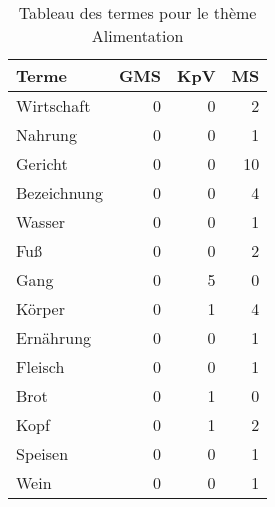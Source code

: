 
\begin{table}[ht]
\centering
\caption{Tableau des termes pour le thème Alimentation}
\label{tab:Alimentation}
\begin{tabular}{lrrr}
\hline
 Terme       &   GMS &   KpV &   MS \\
\hline
 Wirtschaft  &     0 &     0 &    2 \\
 Nahrung     &     0 &     0 &    1 \\
 Gericht     &     0 &     0 &   10 \\
 Bezeichnung &     0 &     0 &    4 \\
 Wasser      &     0 &     0 &    1 \\
 Fuß         &     0 &     0 &    2 \\
 Gang        &     0 &     5 &    0 \\
 Körper      &     0 &     1 &    4 \\
 Ernährung   &     0 &     0 &    1 \\
 Fleisch     &     0 &     0 &    1 \\
 Brot        &     0 &     1 &    0 \\
 Kopf        &     0 &     1 &    2 \\
 Speisen     &     0 &     0 &    1 \\
 Wein        &     0 &     0 &    1 \\
\hline
\end{tabular}
\end{table}
    